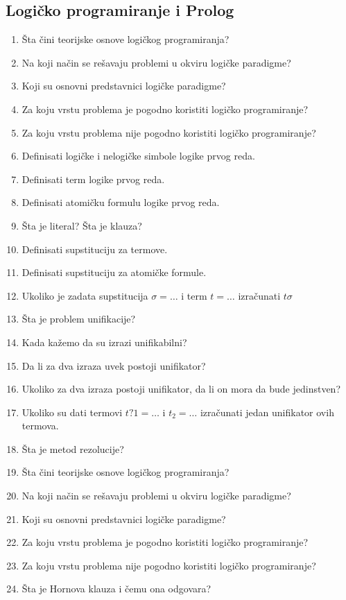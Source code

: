 \documentclass[main.tex]{subfiles}
\begin{document}
\begin{multicols}{2}
\subsection{Logičko programiranje i Prolog}
\begin{enumerate}
\item Šta čini teorijske osnove logičkog programiranja?
\item Na koji način se rešavaju problemi u okviru logičke paradigme?
\item Koji su osnovni predstavnici logičke paradigme?
\item Za koju vrstu problema je pogodno koristiti logičko programiranje?
\item Za koju vrstu problema nije pogodno koristiti logičko programiranje?
\item Definisati logičke i nelogičke simbole logike prvog reda.
\item Definisati term logike prvog reda.
\item Definisati atomičku formulu logike prvog reda.
\item Šta je literal? Šta je klauza?
\item Definisati supstituciju za termove.
\item Definisati supstituciju za atomičke formule.
\item Ukoliko je zadata supstitucija $\sigma = \ldots$ i term $t = \ldots$ izračunati $t\sigma$
\item Šta je problem unifikacije?
\item Kada kažemo da su izrazi unifikabilni?
\item Da li za dva izraza uvek postoji unifikator?
\item Ukoliko za dva izraza postoji unifikator, da li on mora da bude jedinstven?
\item Ukoliko su dati termovi $t?1 = \ldots$ i $t_2 = \ldots$ izračunati jedan unifikator ovih termova.
\item Šta je metod rezolucije?
\item Šta čini teorijske osnove logičkog programiranja?
\item Na koji način se rešavaju problemi u okviru logičke paradigme?
\item Koji su osnovni predstavnici logičke paradigme?
\item Za koju vrstu problema je pogodno koristiti logičko programiranje?
\item Za koju vrstu problema nije pogodno koristiti logičko programiranje?
\item Šta je Hornova klauza i čemu ona odgovara?

\end{enumerate}
\end{multicols}
\end{document}
